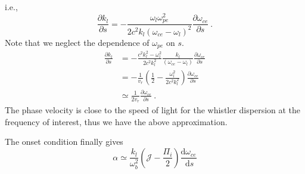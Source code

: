 i.e.,
\begin{equation}
    \frac{\partial k_l}{\partial s} = -\frac{\omega_l \omega_{pe}^2}{2 c^2 k_l \left(\omega_{ce}-\omega_l\right)^2} \frac{\partial \omega_{ce}}{\partial s}~.
\end{equation}
Note that we neglect the dependence of $\omega_{pe}$ on $s$.
\begin{equation}
    \begin{aligned}
        \frac{\partial k_l}{\partial s} &=- \frac{c^2 k_l^2 - \omega_l^2}{2 c^2 k_l^2}\frac{k_l}{(\omega_{ce}-\omega_l)} \frac{\partial \omega_{ce}}{\partial s}
        \\
        &=-\frac{1}{v_r} (\frac{1}{2} - \frac{\omega_l^2}{2c^2 k_l^2}) \frac{\partial \omega_{ce}}{\partial s}
        \\
        &\simeq \frac{1}{2v_r}\frac{\partial \omega_{ce}}{\partial s}~.
    \end{aligned}
\end{equation}
The phase velocity is close to the speed of light for the whistler dispersion at the frequency of interest, thus we have the above approximation.

The onset condition finally gives 
\begin{equation}\label{eq.alp1}
   \alpha \simeq \frac{k_l}{\omega_b^2}\left(\mathcal{J}-\frac{\Pi_i}{2}\right) \frac{\mathrm{d} \omega_{c e}}{\mathrm{~d} s}
    \end{equation}

